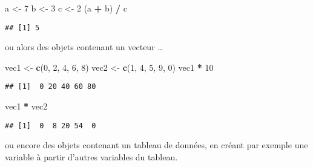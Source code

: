 \documentclass[
  french,
]{book}
\newenvironment{Shaded}{\begin{snugshade}}{\end{snugshade}}
\newcommand{\DecValTok}[1]{\textcolor[rgb]{0.00,0.00,0.81}{#1}}
\newcommand{\KeywordTok}[1]{\textcolor[rgb]{0.13,0.29,0.53}{\textbf{#1}}}
\newcommand{\NormalTok}[1]{#1}
\newcommand{\OperatorTok}[1]{\textcolor[rgb]{0.81,0.36,0.00}{\textbf{#1}}}
\newcommand{\StringTok}[1]{\textcolor[rgb]{0.31,0.60,0.02}{#1}}
\begin{document}
\begin{Shaded}
\begin{Highlighting}[]
\NormalTok{a <-}\StringTok{ }\DecValTok{7}
\NormalTok{b <-}\StringTok{ }\DecValTok{3}
\NormalTok{c <-}\StringTok{ }\DecValTok{2}
\NormalTok{(a }\OperatorTok{+}\StringTok{ }\NormalTok{b) }\OperatorTok{/}\StringTok{ }\NormalTok{c}
\end{Highlighting}
\end{Shaded}

\begin{verbatim}
## [1] 5
\end{verbatim}

ou alors des objets contenant un vecteur \ldots{}

\begin{Shaded}
\begin{Highlighting}[]
\NormalTok{vec1 <-}\StringTok{ }\KeywordTok{c}\NormalTok{(}\DecValTok{0}\NormalTok{, }\DecValTok{2}\NormalTok{, }\DecValTok{4}\NormalTok{, }\DecValTok{6}\NormalTok{, }\DecValTok{8}\NormalTok{)}
\NormalTok{vec2 <-}\StringTok{ }\KeywordTok{c}\NormalTok{(}\DecValTok{1}\NormalTok{, }\DecValTok{4}\NormalTok{, }\DecValTok{5}\NormalTok{, }\DecValTok{9}\NormalTok{, }\DecValTok{0}\NormalTok{)}
\NormalTok{vec1 }\OperatorTok{*}\StringTok{ }\DecValTok{10}
\end{Highlighting}
\end{Shaded}

\begin{verbatim}
## [1]  0 20 40 60 80
\end{verbatim}

\begin{Shaded}
\begin{Highlighting}[]
\NormalTok{vec1 }\OperatorTok{*}\StringTok{ }\NormalTok{vec2}
\end{Highlighting}
\end{Shaded}

\begin{verbatim}
## [1]  0  8 20 54  0
\end{verbatim}

ou encore des objets contenant un tableau de données, en créant par exemple une variable à partir d'autres variables du tableau.

\begin{Shaded}
\end{Shaded}
\end{document}
